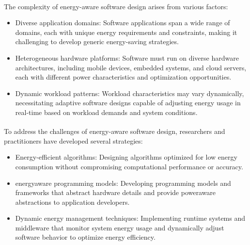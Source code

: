        \paragraph{}
        The complexity of energy-aware software design arises from various factors:
        \begin{itemize}
            \item Diverse application domains: Software applications span a wide range of domains, each with unique energy requirements and constraints, making it challenging to develop generic energy-saving strategies.
            \item Heterogeneous hardware platforms: Software must run on diverse hardware architectures, including mobile devices, embedded systems, and cloud servers, each with different power characteristics and optimization opportunities.
            \item Dynamic workload patterns: Workload characteristics may vary dynamically, necessitating adaptive software designs capable of adjusting energy usage in real-time based on workload demands and system conditions.
        \end{itemize}

        \paragraph{}
        To address the challenges of energy-aware software design, researchers and practitioners have developed several strategies:
        \begin{itemize}
            \item Energy-efficient algorithms: Designing algorithms optimized for low energy consumption without compromising computational performance or accuracy.
            \item \gls{energyaware} programming models: Developing programming models and frameworks that abstract hardware details and provide \gls{poweraware} abstractions to application developers.
            \item Dynamic energy management techniques: Implementing runtime systems and middleware that monitor system energy usage and dynamically adjust software behavior to optimize energy efficiency.
        \end{itemize}

